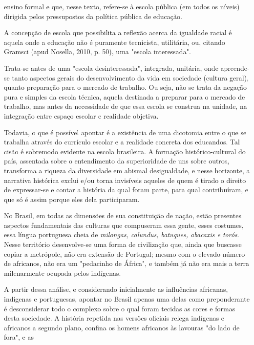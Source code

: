  ensino formal e que, nesse texto, refere-se à escola pública (em todos os níveis)
 dirigida pelos pressupostos da política pública de educação.\par A concepção de escola que possibilita a reflexão acerca da igualdade racial é aquela
 onde a educação não é puramente tecnicista, utilitária, ou, citando Gramsci (apud
 Nosella, 2010, p. 50), uma "escola
 interessada".\par Trata-se antes de uma "escola desinteressada", integrada, unitária, onde apreende-se
 tanto aspectos gerais do desenvolvimento da vida em sociedade (cultura geral), quanto
 preparação para o mercado de trabalho. Ou seja, não se trata da negação pura e
 simples da escola técnica, aquela destinada a preparar para o mercado de trabalho,
 mas antes da necessidade de que essa escola se construa na unidade, na integração
 entre espaço escolar e realidade objetiva.\par Todavia, o que é possível apontar é a existência de uma dicotomia entre o que se
 trabalha através do currículo escolar e a realidade concreta dos educandos. Tal cisão
 é sobremodo evidente na escola brasileira. A formação histórico-cultural do país,
 assentada sobre o entendimento da superioridade de uns sobre outros, transforma a
 riqueza da diversidade em abismal desigualdade, e nesse horizonte, a narrativa
 histórica exclui e/ou torna invisíveis aqueles de quem é tirado o direito de
 expressar-se e contar a história da qual foram parte, para qual contribuíram, e que
 só é assim porque eles dela participaram.\par No Brasil, em todas as dimensões de sua constituição de nação, estão presentes
 aspectos fundamentais das culturas que compuseram essa gente, esses costumes, essa
 língua portuguesa cheia de \textit{milongas, calundus, batuques, abacaxis e
 torós}. Nesse território desenvolve-se uma forma de civilização que, ainda
 que buscasse copiar a metrópole, não era extensão de Portugal; mesmo com o elevado
 número de africanos, não era um "pedacinho de África", e também já não era mais a
 terra milenarmente ocupada pelos indígenas.\par A partir dessa análise, e considerando inicialmente as influências africanas,
 indígenas e portuguesas, apontar no Brasil apenas uma delas como preponderante é
 desconsiderar todo o complexo sobre o qual foram tecidas as cores e formas desta
 sociedade. A história repetida nas versões oficiais relega indígenas e africanos a
 segundo plano, confina os homens africanos às lavouras "do lado de fora", e as
